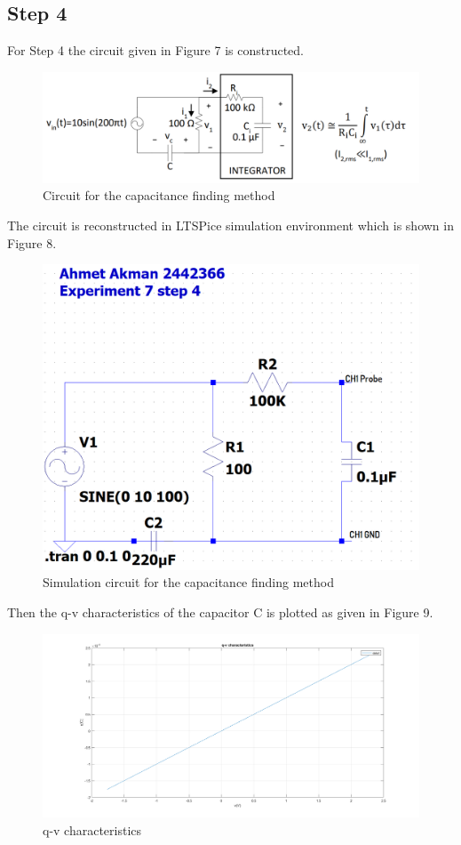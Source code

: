 \documentclass[letterpaper,12pt]{article}
\begin{document}
\subsection{Step 4}
For Step 4 the circuit given  in Figure 7 is constructed. 
\begin{figure}[H]
	\centering
   \includegraphics[width=1\textwidth]{PRE4.png}
   \caption{Circuit for the capacitance finding method}
\end{figure}
The circuit is reconstructed in LTSPice simulation environment which is shown in Figure 8.
\begin{figure}[H]
	\centering
   \includegraphics[width=1\textwidth]{4_SCH.png}
   \caption{Simulation circuit for the capacitance finding method}
\end{figure}
Then the q-v characteristics of the capacitor C is plotted as given in Figure 9.
\begin{figure}[H]
	\centering
   \includegraphics[width=1\textwidth]{4a_plot.png}
   \caption{q-v characteristics}
\end{figure}
\end{document}
